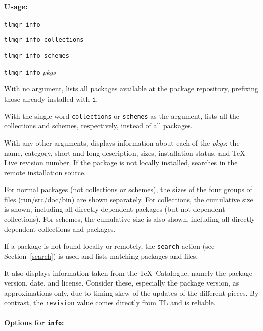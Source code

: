 \documentclass[11pt]{article}
\begin{document}
\paragraph{Usage:}

\begin{list}{}{}
\item \texttt{tlmgr info} 
\item \texttt{tlmgr info collections} 
\item \texttt{tlmgr info schemes}
\item \texttt{tlmgr info} \textsl{pkgs} 
\end{list}

With no argument, lists all packages available at the
package repository, prefixing those already installed with
\texttt{i}.

With the single word \texttt{collections} or
\texttt{schemes} as the argument, lists all the collections
and schemes, respectively, instead of all packages.

With any other arguments, displays information about each
of the \textsl{pkgs}: the name, category, short and long
description, sizes, installation status, and \TeX\,Live
revision number. If the package is not locally installed,
searches in the remote installation source.

For normal packages (not collections or schemes), the sizes
of the four groups of files (run/src/doc/bin) are shown
separately. For collections, the cumulative size is shown,
including all directly-dependent packages (but not dependent
collections). For schemes, the cumulative size is also
shown, including all directly-dependent collections and
packages.

If a package is not found locally or remotely, the
\texttt{search} action (see Section~\ref{search}) is used
and lists matching packages and files.

It also displays information taken from the \TeX\ Catalogue,
namely the package version, date, and license. Consider
these, especially the package version, as approximations
only, due to timing skew of the updates of the different
pieces. By contrast, the \texttt{revision} value comes
directly from TL and is reliable.


\paragraph{Options for \mdseries\texttt{info}:}
\end{document}
